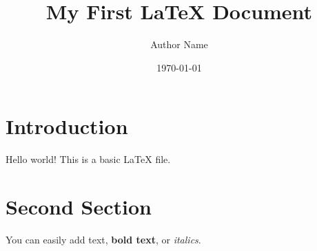 \documentclass[12pt]{article} %
\title{My First LaTeX Document}
\author{Author Name}
\date{\today}
\begin{document}
\maketitle %

\section{Introduction}
Hello world! This is a basic \LaTeX{} file.

\section{Second Section}
You can easily add text, \textbf{bold text}, or \textit{italics}.
\end{document}
